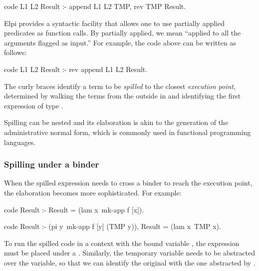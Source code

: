 \documentclass[a4paper, 11pt]{book}
\begin{document}
\begin{elpicode}
code L1 L2 Result :- append L1 L2 TMP, rev TMP Result.
\end{elpicode}

Elpi provides a syntactic facility that allows one to use partially applied
predicates as function calls. By partially applied, we mean ``applied to all
the arguments flagged as input.'' For example, the code above can be written as
follows:

\begin{elpicode}
code L1 L2 Result :- rev {append L1 L2} Result.
\end{elpicode}

The curly braces identify a term to be \emph{spilled} to the closest
\emph{execution point}, determined by walking the terms from the outside in
and identifying the first expression of type .

Spilling can be nested and its elaboration is akin to the generation of the
administrative normal form, which is commonly used in functional programming
languages.

\subsubsection{Spilling under a binder}


When the spilled expression needs to cross a binder to reach the execution
point, the elaboration becomes more sophisticated. For example:

\begin{elpicode}
code Result :- Result = (lam x\ {mk-app f [x]}).

code Result :- (pi y\ mk-app f [y] (TMP y)), Result = (lam x\ TMP x).
\end{elpicode}

To run the spilled code in a context with the bound variable , the
expression must be placed under a . Similarly, the temporary
variable  needs to be abstracted over the variable, so that we can identify
the original  with the one abstracted by .


\end{document}
